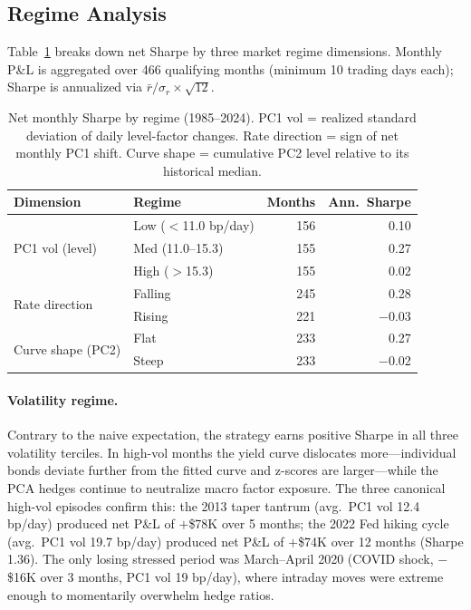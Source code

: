 \documentclass[11pt]{article}
\begin{document}
\subsection{Regime Analysis}

Table~\ref{tab:regime} breaks down net Sharpe by three market regime
dimensions. Monthly P\&L is aggregated over 466 qualifying months
(minimum 10 trading days each); Sharpe is annualized via
$\bar{r}/\sigma_r \times \sqrt{12}$.

\begin{table}[htbp]
\centering
\caption{Net monthly Sharpe by regime (1985--2024).
PC1 vol = realized standard deviation of daily level-factor changes.
Rate direction = sign of net monthly PC1 shift.
Curve shape = cumulative PC2 level relative to its historical median.}
\label{tab:regime}
\begin{tabular}{llrr}
\toprule
Dimension & Regime & Months & Ann.\ Sharpe \\
\midrule
\multirow{3}{*}{PC1 vol (level)}
  & Low  ($<$11.0 bp/day)  & 156 & \phantom{$-$}0.10 \\
  & Med  (11.0--15.3)      & 155 & \phantom{$-$}0.27 \\
  & High ($>$15.3)         & 155 & \phantom{$-$}0.02 \\
\midrule
\multirow{2}{*}{Rate direction}
  & Falling & 245 & \phantom{$-$}0.28 \\
  & Rising  & 221 & $-$0.03 \\
\midrule
\multirow{2}{*}{Curve shape (PC2)}
  & Flat   & 233 & \phantom{$-$}0.27 \\
  & Steep  & 233 & $-$0.02 \\
\bottomrule
\end{tabular}
\end{table}

\paragraph{Volatility regime.}
Contrary to the naive expectation, the strategy earns positive Sharpe in all
three volatility terciles. In high-vol months the yield curve dislocates
more---individual bonds deviate further from the fitted curve and z-scores are
larger---while the PCA hedges continue to neutralize macro factor exposure.
The three canonical high-vol episodes confirm this: the 2013 taper tantrum
(avg.\ PC1 vol 12.4 bp/day) produced net P\&L of $+$\$78K over 5 months; the
2022 Fed hiking cycle (avg.\ PC1 vol 19.7 bp/day) produced net P\&L of
$+$\$74K over 12 months (Sharpe 1.36). The only losing stressed period was
March--April 2020 (COVID shock, $-$\$16K over 3 months, PC1 vol 19 bp/day),
where intraday moves were extreme enough to momentarily overwhelm hedge ratios.
\end{document}
